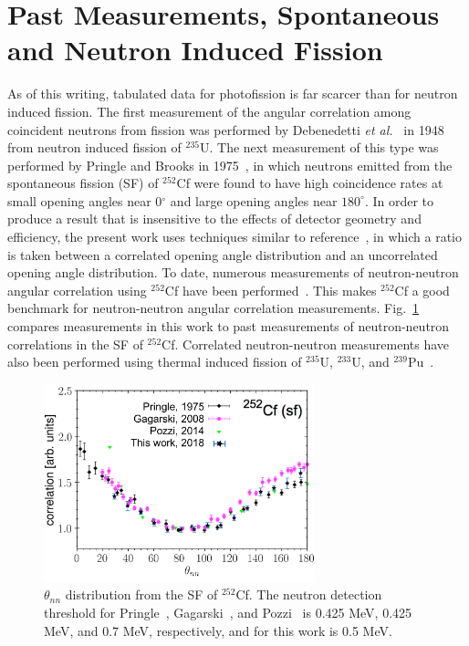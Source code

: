 \section{Past Measurements, Spontaneous and Neutron Induced Fission}
As of this writing, tabulated data for photofission is far scarcer than for neutron induced fission.
The first measurement of the angular correlation among coincident neutrons from fission was performed by Debenedetti \emph{et al.}~\cite{1948twoNCorr} in 1948 from neutron induced fission of $^{235}\text{U}$.
The next measurement of this type was performed by Pringle and Brooks in 1975~\cite{1975Cf252}, in which neutrons emitted from the spontaneous fission (SF) of $^{252}$Cf were found to have high coincidence rates at small opening angles near 0$^{\circ}$ and large opening angles near $180^{\circ}$.
In order to produce a result that is insensitive to the effects of detector geometry and efficiency, the present work uses techniques similar to reference~\cite{1975Cf252}, in which a ratio is taken between a correlated opening angle distribution and an uncorrelated opening angle distribution.
To date, numerous measurements of neutron-neutron angular correlation using $^{252}$Cf have been performed~\cite{Verbeke2018, Pozzi2014, 2008CF252, 1975Cf252}.
This makes $^{252}$Cf a good benchmark for neutron-neutron angular correlation measurements.
Fig.~\ref{fig:Cf252_us_vs_them} compares measurements in this work to past measurements of neutron-neutron correlations in the SF of $^{252}$Cf.
Correlated neutron-neutron measurements have also been performed using thermal induced fission of $^{235}$U, $^{233}$U, and $^{239}$Pu~\cite{Sokolov2010}.
\begin{figure}[h]
\centering
\includegraphics[width=0.7\textwidth]{Content/Introduction/Cf252_us_vs_them.png}
\caption{$\theta_{nn}$ distribution from the SF of $^{252}$Cf.
 The neutron detection threshold for Pringle~\cite{1975Cf252}, Gagarski~\cite{2008CF252}, and Pozzi~\cite{Pozzi2016} is 0.425 MeV, 0.425 MeV, and 0.7 MeV, respectively, and for this work is 0.5 MeV.
}
\label{fig:Cf252_us_vs_them}
\end{figure}
